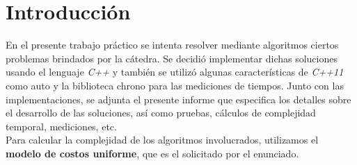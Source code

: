 \section*{Introducción}

En el presente trabajo práctico se intenta resolver mediante algoritmos ciertos problemas brindados por la c\'atedra. 
Se decidi\'o implementar dichas soluciones usando el lenguaje \textit{C++}\cite{cplusplus} y también se utilizó algunas características de \textit{C++11
} como auto y la biblioteca chrono\cite{chrono} para las mediciones de tiempos.
Junto con las implementaciones, se adjunta el presente 
informe que especifica los detalles sobre el desarrollo de las soluciones, as\'i como pruebas, 
cálculos de complejidad temporal, mediciones, etc.\\
Para calcular la complejidad de los algoritmos involucrados, utilizamos el \textbf{modelo de costos uniforme}, que es el solicitado por el enunciado.

